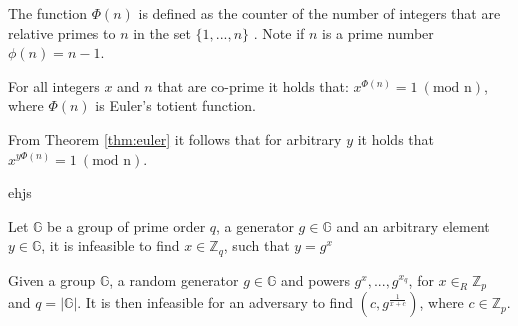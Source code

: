 \begin{Mydef}
The function $\Phi(n)$ is defined as the counter of the number of integers that are relative primes to $n$ in the set $\{1,...,n\}$ . Note if $n$ is a prime number $\phi(n) = n-1$.
\end{Mydef}
\vspace{10pt}
\begin{thm}
\label{thm:euler}
For all integers $x$ and $n$ that are co-prime it holds that:
$x^{\Phi(n)} = 1\:( \text{mod n})$, where $\Phi(n)$ is Euler's totient function.
\end{thm}
\vspace{10pt}
From Theorem \ref{thm:euler} it follows that for arbitrary $y$ it holds that $x^{y\Phi(n)} = 1 \:( \text{mod n})$.
\vspace{10pt}
\begin{Mydef}
ehjs
\end{Mydef}


\begin{Ass}
Let $\mathds{G}$ be a group of prime order $q$, a generator $g\in \mathds{G}$ and an arbitrary element $y \in\mathds{G}$, it is  infeasible to find $x \in \mathds{Z}_q$, such that $y=g^x$
\end{Ass}
\vspace{10pt}
\begin{Ass}
 Given a group $\mathds{G}$, a random generator $g\in \mathds{G}$ and powers $g^x,...,g^{x_q}$, for $x \in_R \mathds{Z}_p$ and  $q= |\mathds{G}|$. It is then  infeasible for an adversary to find $(c, g^{\frac{1}{x+c}})$, where $c \in \mathds{Z}_p$.
\end{Ass}



